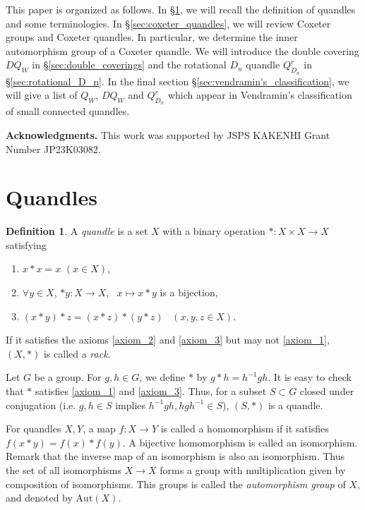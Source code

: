 \documentclass{amsart}
\theoremstyle{definition}
\newtheorem{definition}[theorem]{Definition}
\newtheorem{example}[theorem]{Example}
\theoremstyle{remark}
\numberwithin{equation}{section}
\begin{document}
This paper is organized as follows.
In \S \ref{sec:quandles}, we will recall the definition of quandles and some terminologies. 
In \S \ref{sec:coxeter_quandles}, we will review Coxeter groups and Coxeter quandles.
In particular, we determine the inner automorphism group of a Coxeter quandle.
We will introduce the double covering $DQ_W$ in \S \ref{sec:double_coverings} and 
the rotational $D_n$ quandle $Q^r_{D_n}$ in \S\ref{sec:rotational_D_n}.
In the final section \S \ref{sec:vendramin's_classification}, 
we will give a list of $Q_W$, $DQ_W$ and $Q^r_{D_n}$ 
which appear in Vendramin's classification of small connected quandles.

\medskip\medskip
\noindent
\textbf{Acknowledgments.}
This work was supported by JSPS KAKENHI Grant Number JP23K03082.

\section{Quandles}
\label{sec:quandles}
\begin{definition}
A \emph{quandle} is a set $X$ with a binary operation $* : X \times X \to X$ satisfying 
\begin{enumerate}[label={(Q\arabic*)}]
\item
\label{axiom_1}
$x * x = x$ $(x \in X)$,
\item
\label{axiom_2}
$\forall y \in X$, $* y : X \to X$, \,  $x \mapsto x*y$ is a bijection,
\item
\label{axiom_3}
$(x*y)*z = (x*z) * (y*z)$ \, $(x, y, z \in X)$.
\end{enumerate}
If it satisfies the axioms \ref{axiom_2} and \ref{axiom_3} but may not \ref{axiom_1}, 
$(X,*)$  is called a \emph{rack}.
\end{definition}

Let $G$ be a group. 
For $g, h \in G$, we define $*$ by $g*h = h^{-1} g h$.
It is easy to check that $*$ satisfies \ref{axiom_1} and \ref{axiom_3}.
Thus, for a subset $S \subset G$ closed under conjugation 
(i.e. $g, h \in S$ implies $h^{-1} g h, h g h^{-1} \in S$), 
$(S, *)$ is a quandle.


For quandles $X, Y$, a map $f: X \to Y$ is called a homomorphism 
if it satisfies $f(x * y) = f(x) * f(y)$.
A bijective homomorphism is called an isomorphism. 
Remark that the inverse map of an isomorphism is also an isomorphism.
Thus the set of all isomorphisms $X \to X$ forms a group with multiplication 
given by composition of isomorphisms. 
This groups is called the \emph{automorphism group} of $X$, 
and denoted by $\mathrm{Aut}(X)$.
\end{document}
